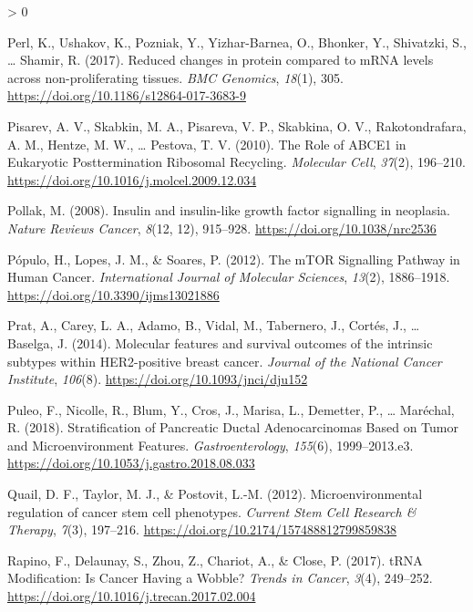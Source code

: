 \documentclass[
  12pt,
  openany]{book}
\newlength{\cslhangindent}
\newenvironment{CSLReferences}[2] %
 {%
  \setlength{\parindent}{0pt}
  \ifodd #1 \everypar{\setlength{\hangindent}{\cslhangindent}}\ignorespaces\fi
  \ifnum #2 > 0
  \setlength{\parskip}{#2\baselineskip}
  \fi
 }%
 {}
\begin{document}
\begin{CSLReferences}{1}{0}
\leavevmode\hypertarget{ref-Perl2017}{}%
Perl, K., Ushakov, K., Pozniak, Y., Yizhar-Barnea, O., Bhonker, Y., Shivatzki, S., \ldots{} Shamir, R. (2017). Reduced changes in protein compared to {mRNA} levels across non-proliferating tissues. \emph{BMC Genomics}, \emph{18}(1), 305. \url{https://doi.org/10.1186/s12864-017-3683-9}

\leavevmode\hypertarget{ref-Pisarev2010}{}%
Pisarev, A. V., Skabkin, M. A., Pisareva, V. P., Skabkina, O. V., Rakotondrafara, A. M., Hentze, M. W., \ldots{} Pestova, T. V. (2010). The {Role} of {ABCE1} in {Eukaryotic Posttermination Ribosomal Recycling}. \emph{Molecular Cell}, \emph{37}(2), 196--210. \url{https://doi.org/10.1016/j.molcel.2009.12.034}

\leavevmode\hypertarget{ref-Pollak2008}{}%
Pollak, M. (2008). Insulin and insulin-like growth factor signalling in neoplasia. \emph{Nature Reviews Cancer}, \emph{8}(12, 12), 915--928. \url{https://doi.org/10.1038/nrc2536}

\leavevmode\hypertarget{ref-Populo2012}{}%
Pópulo, H., Lopes, J. M., \& Soares, P. (2012). The {mTOR Signalling Pathway} in {Human Cancer}. \emph{International Journal of Molecular Sciences}, \emph{13}(2), 1886--1918. \url{https://doi.org/10.3390/ijms13021886}

\leavevmode\hypertarget{ref-Prat2014}{}%
Prat, A., Carey, L. A., Adamo, B., Vidal, M., Tabernero, J., Cortés, J., \ldots{} Baselga, J. (2014). Molecular features and survival outcomes of the intrinsic subtypes within {HER2}-positive breast cancer. \emph{Journal of the National Cancer Institute}, \emph{106}(8). \url{https://doi.org/10.1093/jnci/dju152}

\leavevmode\hypertarget{ref-Puleo2018}{}%
Puleo, F., Nicolle, R., Blum, Y., Cros, J., Marisa, L., Demetter, P., \ldots{} Maréchal, R. (2018). Stratification of {Pancreatic Ductal Adenocarcinomas Based} on {Tumor} and {Microenvironment Features}. \emph{Gastroenterology}, \emph{155}(6), 1999--2013.e3. \url{https://doi.org/10.1053/j.gastro.2018.08.033}

\leavevmode\hypertarget{ref-Quail2012}{}%
Quail, D. F., Taylor, M. J., \& Postovit, L.-M. (2012). Microenvironmental regulation of cancer stem cell phenotypes. \emph{Current Stem Cell Research \& Therapy}, \emph{7}(3), 197--216. \url{https://doi.org/10.2174/157488812799859838}

\leavevmode\hypertarget{ref-Rapino2017}{}%
Rapino, F., Delaunay, S., Zhou, Z., Chariot, A., \& Close, P. (2017). {tRNA Modification}: {Is Cancer Having} a {Wobble}? \emph{Trends in Cancer}, \emph{3}(4), 249--252. \url{https://doi.org/10.1016/j.trecan.2017.02.004}


\end{CSLReferences}
\end{document}
